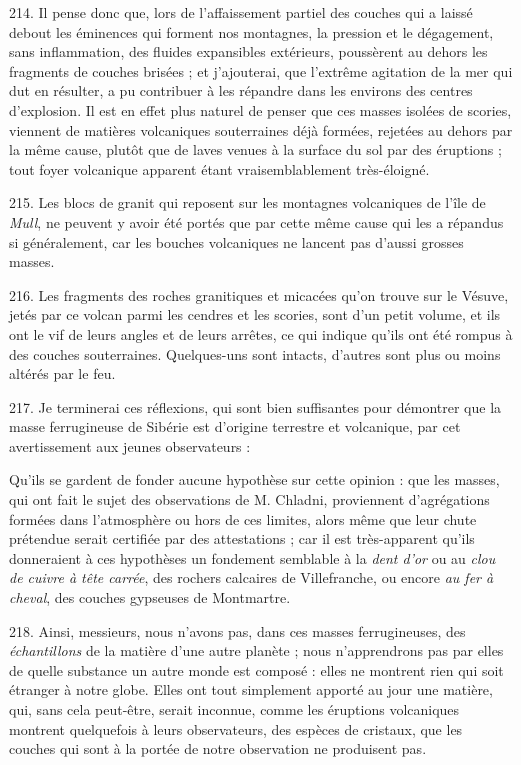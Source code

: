 \documentclass[a4paper, 11pt, oneside, polutonikogreek, french]{article}
\begin{document}
214. Il pense donc que, lors de l'affaissement partiel des couches qui a laissé debout les éminences qui forment nos montagnes, la pression et le dégagement, sans inflammation, des fluides expansibles extérieurs, poussèrent au dehors les fragments de couches brisées ; et j'ajouterai, que l'extrême agitation de la mer qui dut en résulter, a pu contribuer à les répandre dans les environs des centres d'explosion. Il est en effet plus naturel de penser que ces masses isolées de scories, viennent de matières volcaniques souterraines déjà formées, rejetées au dehors par la même cause, plutôt que de laves venues à la surface du sol par des éruptions ; tout foyer volcanique apparent étant vraisemblablement très-éloigné.

215. Les blocs de granit qui reposent sur les montagnes volcaniques de l'île de \emph{Mull}, ne peuvent y avoir été portés que par cette même cause qui les a répandus si généralement, car les bouches volcaniques ne lancent pas d'aussi grosses masses.

216. Les fragments des roches granitiques et micacées qu'on trouve sur le Vésuve, jetés par ce volcan parmi les cendres et les scories, sont d'un petit volume, et ils ont le vif de leurs angles et de leurs arrêtes, ce qui indique qu'ils ont été rompus à des couches souterraines. Quelques-uns sont intacts, d'autres sont plus ou moins altérés par le feu.

217. Je terminerai ces réflexions, qui sont bien suffisantes pour démontrer que la masse ferrugineuse de Sibérie est d'origine terrestre et volcanique, par cet avertissement aux jeunes observateurs :

\og Qu'ils se gardent de fonder aucune hypothèse sur cette opinion : que les masses, qui ont fait le sujet des observations de M. Chladni, proviennent d'agrégations formées dans l'atmosphère ou hors de ces limites, alors même que leur chute prétendue serait certifiée par des attestations ; car il est très-apparent qu'ils donneraient à ces hypothèses un fondement semblable à la \emph{dent d'or} ou au \emph{clou de cuivre à tête carrée}, des rochers calcaires de Villefranche, ou encore \emph{au fer à cheval}, des couches gypseuses de Montmartre. \fg

218. Ainsi, messieurs, nous n'avons pas, dans ces masses ferrugineuses, des \emph{échantillons} de la matière d'une autre planète ; nous n'apprendrons pas par elles de quelle substance un autre monde est composé : elles ne montrent rien qui soit étranger à notre globe. Elles ont tout simplement apporté au jour une matière, qui, sans cela peut-être, serait inconnue, comme les éruptions volcaniques montrent quelquefois à leurs observateurs, des espèces de cristaux, que les couches qui sont à la portée de notre observation ne produisent pas.
\end{document}

